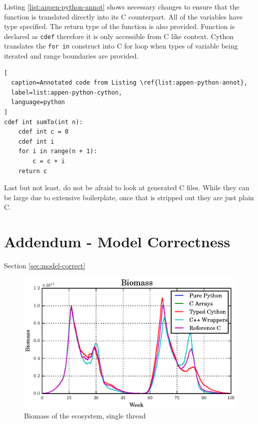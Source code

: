 \documentclass[12pt, a4paper]{report}
\begin{document}
\begin{appendices}
Listing \ref{list:appen-python-annot} shows necessary changes to ensure that the
function is translated directly into its C counterpart. All of the variables
have type specified. The return type of the function is also provided. Function
is declared as \lstinline{cdef} therefore it is only accessible from C like context.
Cython translates the \lstinline{for in} construct into C for loop when types of
variable being iterated and range boundaries are provided.

\begin{lstlisting}[
  caption=Annotated code from Listing \ref{list:appen-python-annot},
  label=list:appen-python-cython,
  language=python
]
cdef int sumTo(int n):
    cdef int c = 0
    cdef int i
    for i in range(n + 1):
        c = c + i
    return c
\end{lstlisting}

Last but not least, do not be afraid to look at generated C files. While they
can be large due to extensive boilerplate, once that is stripped out they are
just plain C.

\chapter{Addendum - Model Correctness}\label{appen-ch:add-model-correctness}
Section \ref{sec:model-correct}

\begin{figure}[H]
  \begin{center}
    \includegraphics[width=\columnwidth]{graphs/bio-fixed-single-float-comp.eps}
    \caption{Biomass of the ecosystem, single thread}
    \label{fig:bio-fixed-single-float-comp}
  \end{center}
\end{figure}


\end{appendices}
\end{document}
